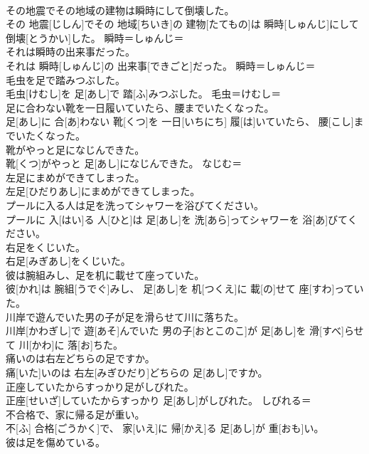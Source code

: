 \documentclass[8pt]{extreport}
\begin{document}
\begin{CJK}{UTF8}{min}
{\\	その地震でその地域の建物は瞬時にして倒壊した。	
\\	その 地震[じしん]でその 地域[ちいき]の 建物[たてもの]は 瞬時[しゅんじ]にして 倒壊[とうかい]した。	瞬時＝しゅんじ＝ 
\\	それは瞬時の出来事だった。	
\\	それは 瞬時[しゅんじ]の 出来事[できごと]だった。	瞬時＝しゅんじ＝ 
\\	毛虫を足で踏みつぶした。	
\\	毛虫[けむし]を 足[あし]で 踏[ふ]みつぶした。	毛虫＝けむし＝ 
\\	足に合わない靴を一日履いていたら、腰までいたくなった。	
\\	足[あし]に 合[あ]わない 靴[くつ]を 一日[いちにち] 履[は]いていたら、 腰[こし]までいたくなった。	
\\	靴がやっと足になじんできた。	
\\	靴[くつ]がやっと 足[あし]になじんできた。	なじむ＝ 
\\	左足にまめができてしまった。	
\\	左足[ひだりあし]にまめができてしまった。	
\\	プールに入る人は足を洗ってシャワーを浴びてください。	
\\	プールに 入[はい]る 人[ひと]は 足[あし]を 洗[あら]ってシャワーを 浴[あ]びてください。	
\\	右足をくじいた。	
\\	右足[みぎあし]をくじいた。	
\\	彼は腕組みし、足を机に載せて座っていた。	
\\	彼[かれ]は 腕組[うでぐ]みし、 足[あし]を 机[つくえ]に 載[の]せて 座[すわ]っていた。	
\\	川岸で遊んでいた男の子が足を滑らせて川に落ちた。	
\\	川岸[かわぎし]で 遊[あそ]んでいた 男の子[おとこのこ]が 足[あし]を 滑[すべ]らせて 川[かわ]に 落[お]ちた。	
\\	痛いのは右左どちらの足ですか。	
\\	痛[いた]いのは 右左[みぎひだり]どちらの 足[あし]ですか。	
\\	正座していたからすっかり足がしびれた。	
\\	正座[せいざ]していたからすっかり 足[あし]がしびれた。	しびれる＝ 
\\	不合格で、家に帰る足が重い。	
\\	不[ふ] 合格[ごうかく]で、 家[いえ]に 帰[かえ]る 足[あし]が 重[おも]い。	
\\	彼は足を傷めている。	
}
\end{CJK}
\end{document}
